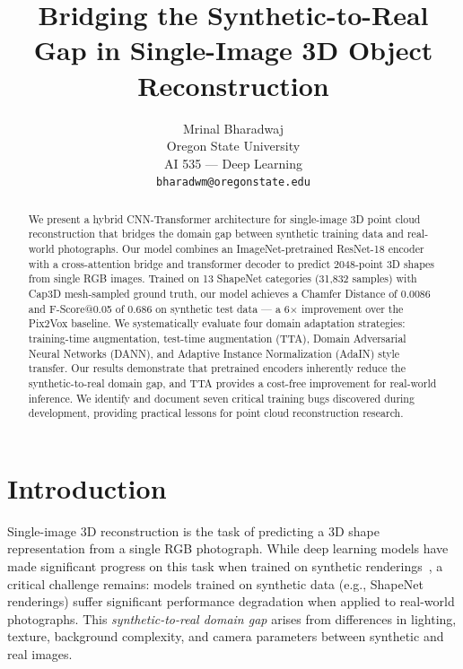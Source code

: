 \documentclass[10pt,twocolumn,letterpaper]{article}
\begin{document}
\title{Bridging the Synthetic-to-Real Gap in Single-Image 3D Object Reconstruction}

\author{Mrinal Bharadwaj\\
Oregon State University\\
AI 535 --- Deep Learning\\
{\tt\small bharadwm@oregonstate.edu}
}

\maketitle

\begin{abstract}
We present a hybrid CNN-Transformer architecture for single-image 3D point cloud reconstruction that bridges the domain gap between synthetic training data and real-world photographs.
Our model combines an ImageNet-pretrained ResNet-18 encoder with a cross-attention bridge and transformer decoder to predict 2048-point 3D shapes from single RGB images.
Trained on 13 ShapeNet categories (31,832 samples) with Cap3D mesh-sampled ground truth, our model achieves a Chamfer Distance of 0.0086 and F-Score@0.05 of 0.686 on synthetic test data --- a 6$\times$ improvement over the Pix2Vox baseline.
We systematically evaluate four domain adaptation strategies: training-time augmentation, test-time augmentation (TTA), Domain Adversarial Neural Networks (DANN), and Adaptive Instance Normalization (AdaIN) style transfer.
Our results demonstrate that pretrained encoders inherently reduce the synthetic-to-real domain gap, and TTA provides a cost-free improvement for real-world inference.
We identify and document seven critical training bugs discovered during development, providing practical lessons for point cloud reconstruction research.
\end{abstract}

\section{Introduction}

Single-image 3D reconstruction is the task of predicting a 3D shape representation from a single RGB photograph.
While deep learning models have made significant progress on this task when trained on synthetic renderings~\cite{choy20163d, fan2017point, wang2018pixel2mesh}, a critical challenge remains: models trained on synthetic data (e.g., ShapeNet~\cite{chang2015shapenet} renderings) suffer significant performance degradation when applied to real-world photographs.
This \emph{synthetic-to-real domain gap} arises from differences in lighting, texture, background complexity, and camera parameters between synthetic and real images.
\end{document}
